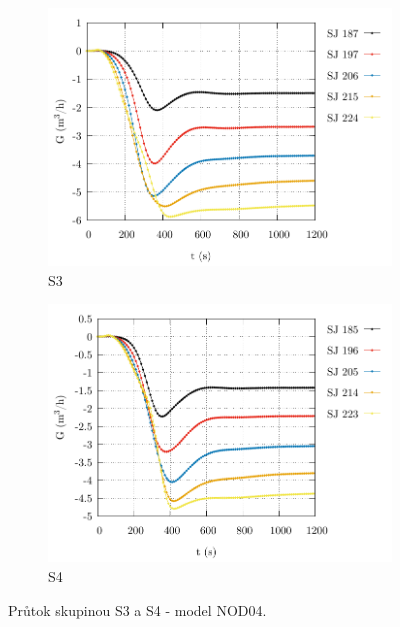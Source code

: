 \begin{figure}
	\centering
	\begin{subfigure}{0.5\textwidth}
		\centering
		\includegraphics[width=\textwidth, trim={0cm 0cm 0cm 0cm}, clip]{./05_TH_model_VR_1/grafy/G_time_nod_04_2.pdf}
		\caption{S3}
		\label{fig:g_time_nod_04_2_prilohy}
	\end{subfigure}%
	\hfill
	\begin{subfigure}{0.5\textwidth}
		\centering
		\includegraphics[width=\textwidth, trim={0cm 0cm 0cm 0cm}, clip]{./05_TH_model_VR_1/grafy/G_time_nod_04_3.pdf}
		\caption{S4}
		\label{fig:g_time_nod_04_3_prilohy}
	\end{subfigure}%
	\caption{Průtok skupinou S3 a S4 - model NOD04.}
\end{figure}
